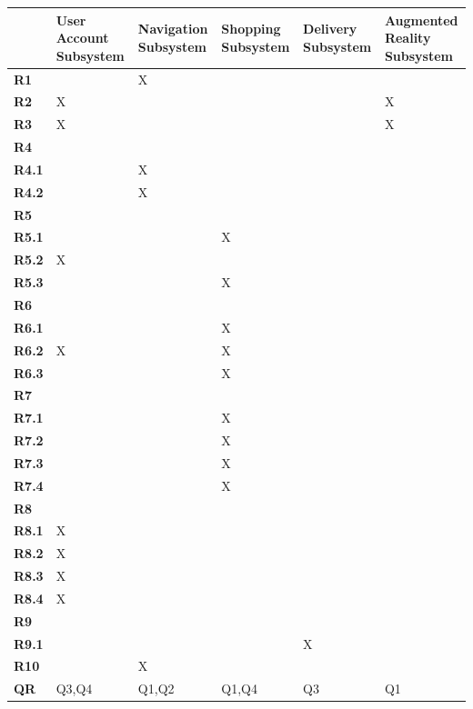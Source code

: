 \documentclass{article}
\begin{document}
\begin{center}
        \begin{tabular}{ |p{1cm}|>{\centering}p{2.5cm}|>{\centering}p{2cm}|>{\centering}p{1.9cm}|>{\centering}p{1.9cm}|>{\centering}p{3.3cm}| }
             \hline
              & \textbf{User Account Subsystem} & \textbf{Navigation Subsystem} & \textbf{Shopping Subsystem} & \textbf{Delivery Subsystem} & \textbf{Augmented Reality Subsystem} \tabularnewline
             \hline
             \textbf{R1} & & X & & & \\
             \hline
              \textbf{R2} &X & & & & X\tabularnewline
             \hline
             \textbf{R3} &X & & & & X\tabularnewline
             \hline
             \textbf{R4} & & & & & \\
             \hline
             \textbf{R4.1} & &X & & & \\
             \hline
             \textbf{R4.2} & &X & & & \\
             \hline
             \textbf{R5} & & & & & \\
             \hline
             \textbf{R5.1} & & &X & & \\
             \hline
             \textbf{R5.2} &X & & & & \\
             \hline
             \textbf{R5.3} & & &X & & \\
             \hline
             \textbf{R6} & & & & & \\
             \hline
             \textbf{R6.1} & & &X & & \\
             \hline
             \textbf{R6.2} &X & &X & & \\
             \hline
             \textbf{R6.3} & & &X & & \\
             \hline
             \textbf{R7} & & & & & \\
             \hline
             \textbf{R7.1} & & &X & & \\
             \hline
             \textbf{R7.2} & & &X & & \\
             \hline
             \textbf{R7.3} & & &X & & \\
             \hline
             \textbf{R7.4} & & & X& & \\
             \hline
             \textbf{R8} & & & & & \\
             \hline
             \textbf{R8.1} &X & & & & \\
             \hline
             \textbf{R8.2} &X & & & & \\
             \hline
             \textbf{R8.3} &X & & & & \\
             \hline
             \textbf{R8.4} &X & & & & \\
             \hline
             \textbf{R9} & & & & & \\
             \hline
             \textbf{R9.1} & & & &X & \\
             \hline
             \textbf{R10} & &X & & & \\
             \hline
             \hline
             \textbf{QR}& Q3,Q4 &Q1,Q2 & Q1,Q4 & Q3 & Q1 \tabularnewline
             \hline
        \end{tabular}
    \end{center}
\end{document}
